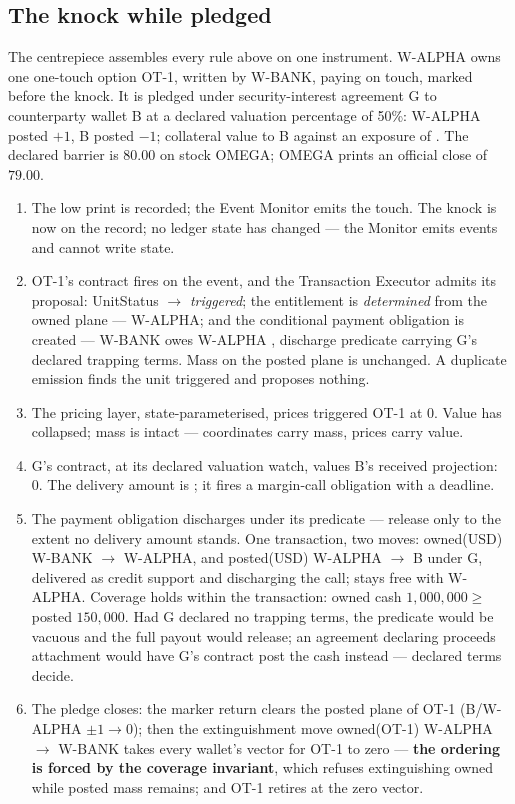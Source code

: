 \subsection{The knock while pledged}

The centrepiece assembles every rule above on one instrument. W-ALPHA owns one
one-touch option OT-1, written by W-BANK, paying  on touch,
marked  before the knock. It is pledged under security-interest
agreement G to counterparty wallet B at a declared valuation percentage of
50\%: W-ALPHA posted $+1$, B posted $-1$; collateral value to B
 against an exposure of . The declared barrier is
$80.00$ on stock OMEGA; OMEGA prints an official close of $79.00$.

\begin{enumerate}[label=\textbf{\arabic*.},nosep,itemsep=2pt]
\item The low print is recorded; the Event Monitor emits the touch. The knock
is now on the record; no ledger state has changed --- the Monitor emits
events and cannot write state.
\item OT-1's contract fires on the event, and the Transaction Executor admits
its proposal: UnitStatus $\to$ \emph{triggered}; the entitlement is
\emph{determined} from the owned plane --- W-ALPHA; and the conditional
payment obligation is created --- W-BANK owes W-ALPHA ,
discharge predicate carrying G's declared trapping terms. Mass on the posted
plane is unchanged. A duplicate emission finds the unit triggered and proposes
nothing.
\item The pricing layer, state-parameterised, prices triggered OT-1 at 0.
Value has collapsed; mass is intact --- coordinates carry mass, prices carry
value.
\item G's contract, at its declared valuation watch, values B's received
projection: 0. The delivery amount is ; it fires a margin-call
obligation with a deadline.
\item The payment obligation discharges under its predicate --- release only
to the extent no delivery amount stands. One transaction, two moves:
owned(USD)  W-BANK $\to$ W-ALPHA, and posted(USD)
 W-ALPHA $\to$ B under G, delivered as credit support and
discharging the call;  stays free with W-ALPHA. Coverage holds
within the transaction: owned cash $1{,}000{,}000 \ge$ posted $150{,}000$.
Had G declared no trapping terms, the predicate would be vacuous and the full
payout would release; an agreement declaring proceeds attachment would have
G's contract post the cash instead --- declared terms decide.
\item The pledge closes: the marker return clears the posted plane of OT-1
(B/W-ALPHA $\pm 1 \to 0$); then the extinguishment move owned(OT-1) W-ALPHA
$\to$ W-BANK takes every wallet's vector for OT-1 to zero --- \textbf{the
ordering is forced by the coverage invariant}, which refuses extinguishing
owned while posted mass remains; and OT-1 retires at the zero vector.
\end{enumerate}

